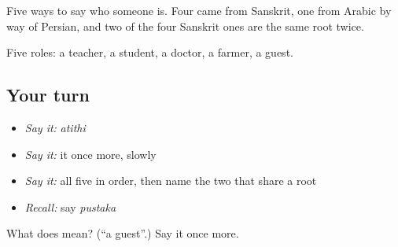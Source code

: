 Five ways to say who someone is. Four came from Sanskrit, one from Arabic by way of Persian, and two of the four Sanskrit ones are the same root twice.

\begin{grammarlens}[title={What you've built}]
Five roles: a teacher, a student, a doctor, a farmer, a guest.
\end{grammarlens}

\subsection*{Your turn}
\begin{itemize}
\raggedright
  \item \emph{Say it:} \emph{atithi}
  \item \emph{Say it:} it once more, slowly
  \item \emph{Say it:} all five in order, then name the two that share a root
  \item \emph{Recall:} say \emph{pustaka}
\end{itemize}

\begin{tcolorbox}[breakable,colback=teal!4,colframe=teal!35!black,title={Before you move on}]
What does  mean? (\textquotedblleft{}a guest\textquotedblright{}.) Say it once more.
\end{tcolorbox}
